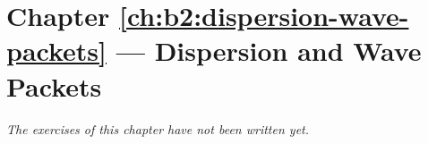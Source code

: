 \section*{Chapter \ref{ch:b2:dispersion-wave-packets} --- Dispersion and Wave Packets}


\emph{The exercises of this chapter have not been written yet.}
